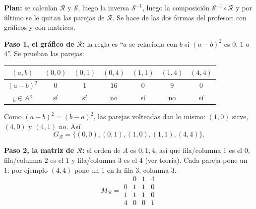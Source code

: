 \documentclass[11pt]{article}
\newcommand{\R}{\mathcal{R}}
\newcommand{\Sr}{\mathcal{S}}
\begin{document}
\begin{explica}
\textbf{Plan:} se calculan $\R$ y $\Sr$, luego la inversa $\Sr^{-1}$, luego la composición $\Sr^{-1}\circ\R$ y por último se le quitan las parejas de $\R$. Se hace de las dos formas del profesor: con gráficos y con matrices.

\textbf{Paso 1, el gráfico de $\R$:} la regla es ``$a$ se relaciona con $b$ si $(a-b)^2$ es $0$, $1$ o $4$''. Se prueban las parejas:
\begin{center}
\renewcommand{\arraystretch}{1.25}\small
\begin{tabular}{c|c|c|c|c|c|c}
$(a,b)$ & $(0,0)$ & $(0,1)$ & $(0,4)$ & $(1,1)$ & $(1,4)$ & $(4,4)$\\\hline
$(a-b)^2$ & $0$ & $1$ & $16$ & $0$ & $9$ & $0$\\\hline
¿$\in A$? & sí & sí & \textcolor{red!75!black}{no} & sí & \textcolor{red!75!black}{no} & sí
\end{tabular}
\end{center}
Como $(a-b)^2=(b-a)^2$, las parejas volteadas dan lo mismo: $(1,0)$ sirve, $(4,0)$ y $(4,1)$ no. Así
\[G_\R=\{(0,0),(0,1),(1,0),(1,1),(4,4)\}.\]

\textbf{Paso 2, la matriz de $\R$:} el orden de $A$ es $0,1,4$, así que fila/columna 1 es el $0$, fila/columna 2 es el $1$ y fila/columna 3 es el $4$ (ver teoría). Cada pareja pone un 1: por ejemplo $(4,4)$ pone un 1 en la fila 3, columna 3.
\[
M_\R=\begin{array}{c|ccc} & 0 & 1 & 4\\\hline 0&1&1&0\\ 1&1&1&0\\ 4&0&0&1\end{array}
\]
\end{explica}
\end{document}
